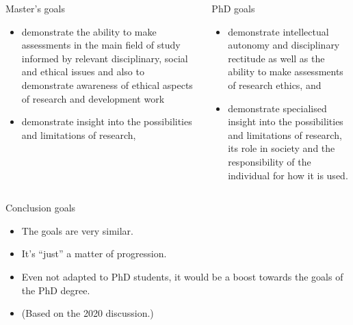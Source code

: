 \begin{frame}[fragile]
  \footnotesize
  \begin{columns}[t]
    \begin{column}{0.5\columnwidth}
      \begin{block}{Master's goals~\cite{HEO2}}
        \begin{itemize}
          \item demonstrate the ability to make assessments in the main field 
            of study informed by relevant disciplinary, social and ethical 
            issues and also to demonstrate awareness of ethical aspects of 
            research and development work
          \item demonstrate insight into the possibilities and limitations of 
            research, \textelp{}
        \end{itemize}
      \end{block}
    \end{column}
    \begin{column}{0.5\columnwidth}
      \begin{block}{PhD goals~\cite{HEO2}}
        \begin{itemize}
          \item demonstrate intellectual autonomy and disciplinary rectitude as 
            well as the ability to make assessments of research ethics, and
          \item demonstrate specialised insight into the possibilities and 
            limitations of research, its role in society and the responsibility 
            of the individual for how it is used.
        \end{itemize}
      \end{block}
    \end{column}
  \end{columns}
\end{frame}

\begin{frame}[fragile]
  \begin{block}{Conclusion goals}
    \begin{itemize}
      \item The goals are very similar.
      \item It's \enquote{just} a matter of progression.
    \end{itemize}
  \end{block}

  \begin{remark}
    \begin{itemize}
      \item Even not adapted to PhD students, it would be a boost towards the 
        goals of the PhD degree.
      \item (Based on the 2020 discussion.)
    \end{itemize}
  \end{remark}
\end{frame}


